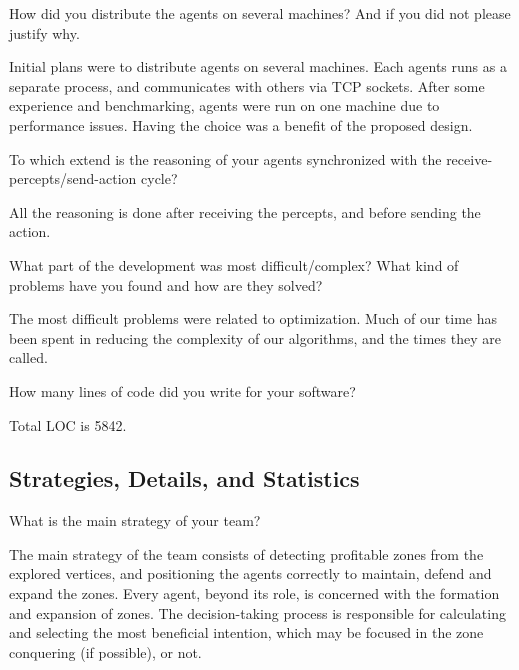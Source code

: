 \begin{question}
How did you distribute the agents on several machines? And if you did not
please justify why.  
\end{question}

Initial plans were to distribute agents on several machines. Each agents runs as
a separate process, and communicates with others via TCP sockets. After some
experience and benchmarking, agents were run on one machine due to performance
issues. Having the choice was a benefit of the proposed design.

\begin{question}
To which extend is the reasoning of your agents synchronized with the
receive-percepts/send-action cycle?
\end{question}

All the reasoning is done after receiving the percepts, and before sending the
action.

\begin{question}
What part of the development was most difficult/complex? What kind of problems
have you found and how are they solved?  
\end{question}

The most difficult problems were related to optimization. Much of our time has
been spent in reducing the complexity of our algorithms, and the times they are
called.

\begin{question}
How many lines of code did you write for your software?  
\end{question}

Total LOC is 5842.

\subsection{Strategies, Details, and Statistics}
\setcounter{question}{0}

\begin{question}
What is the main strategy of your team?
\end{question}

The main strategy of the team consists of detecting profitable zones from the
explored vertices, and positioning the agents correctly to maintain, defend and
expand the zones.  Every agent, beyond its role, is concerned with the formation
and expansion of zones.  The decision-taking process is responsible for
calculating and selecting the most beneficial intention, which may be focused in
the zone conquering (if possible), or not.
    
